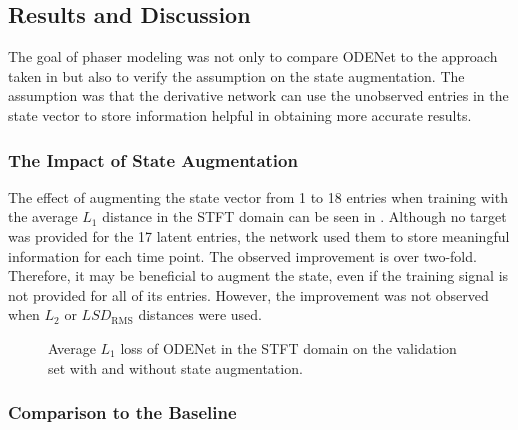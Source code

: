 \subsection{Results and Discussion}
\label{sec:phaser_results}

The goal of phaser modeling was not only to compare ODENet to the approach taken in \cite{Wright2020} but also to verify the assumption on the state augmentation. The assumption was that the derivative network can use the unobserved entries in the state vector to store information helpful in obtaining more accurate results.

\subsubsection{The Impact of State Augmentation}
The effect of augmenting the state vector from 1 to 18 entries when training with the average $L_1$ distance in the \ac{STFT} domain can be seen in . Although no target was provided for the 17 latent entries, the network used them to store meaningful information for each time point. The observed improvement is over two-fold. Therefore, it may be beneficial to augment the state, even if the training signal is not provided for all of its entries. However, the improvement was not observed when $L_2$ or $LSD_\text{RMS}$ distances were used.

\begin{figure}
    \centering
    
    \caption{Average $L_1$ loss of ODENet in the \ac{STFT} domain on the validation set with and without state augmentation.}
    \label{fig:state_augmentation}
\end{figure}

\subsubsection{Comparison to the Baseline}

